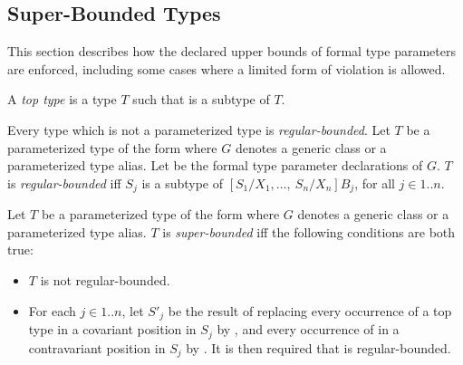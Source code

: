 \documentclass{article}
\begin{document}
\subsection{Super-Bounded Types}

\LMHash{}
This section describes how
the declared upper bounds of formal type parameters are enforced,
including some cases where a limited form of violation is allowed.

\LMHash{}
A {\em top type} is a type $T$ such that  is a subtype of $T$.


\LMHash{}
Every type which is not a parameterized type is {\em regular-bounded}.
Let $T$ be a parameterized type of the form
where $G$ denotes a generic class or a parameterized type alias.
Let
be the formal type parameter declarations of $G$.
$T$ is {\em regular-bounded} if{}f
$S_j$ is a subtype of
$[S_1/X_1, \ldots,\ S_n/X_n]B_j$,
for all $j \in 1 .. n$.


\LMHash{}
Let $T$ be a parameterized type of the form
where $G$ denotes a generic class or a parameterized type alias.
$T$ is {\em super-bounded} if{}f the following conditions are both true:

\begin{itemize}
\item
  $T$ is not regular-bounded.
\item
  For each $j \in 1 .. n$, let $S'_j$ be the result of replacing
  every occurrence of a top type
  in a covariant position in $S_j$ by ,
  and every occurrence of 
  in a contravariant position in $S_j$ by .
  It is then required that
  is regular-bounded.
\end{itemize}
\end{document}
